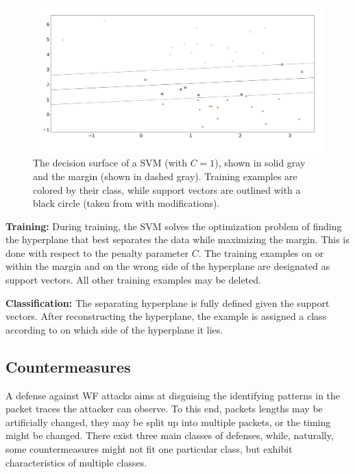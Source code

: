 \documentclass[
	ruledheaders=chapter,
	class=report,
	thesis={type=master, department=inf},
	accentcolor=1c,
	custommargins=true,
	marginpar=false,
	parskip=half-,
	fontsize=11pt,
]{tudapub}
\begin{document}
	\begin{figure}[tb]
		\centering
		\includegraphics[width=\textwidth]{svm.png}
		\caption{The decision surface of a SVM (with $C = 1$), shown in solid gray and the margin (shown in dashed gray). Training examples are colored by their class, while support vectors are outlined with a black circle (taken from \cite{sklearn-linearSvc} with modifications).}
		\label{fig:svm}
	\end{figure}

	\textbf{Training:} During training, the SVM solves the optimization problem of finding the hyperplane that best separates the data while maximizing the margin. This is done with respect to the penalty parameter $C$. The training examples on or within the margin and on the wrong side of the hyperplane are designated as support vectors. All other training examples may be deleted.
	
	\textbf{Classification:} The separating hyperplane is fully defined given the support vectors. After reconstructing the hyperplane, the example is assigned a class according to on which side of the hyperplane it lies.

	\subsection{Countermeasures}
	\label{theoretical:defenses}

	A defense against WF attacks aims at disguising the identifying patterns in the packet traces the attacker can observe. To this end, packets lengths may be artificially changed, they may be split up into multiple packets, or the timing might be changed. There exist three main classes of defenses, while, naturally, some countermeasures might not fit one particular class, but exhibit characteristics of multiple classes.
	
\end{document}

